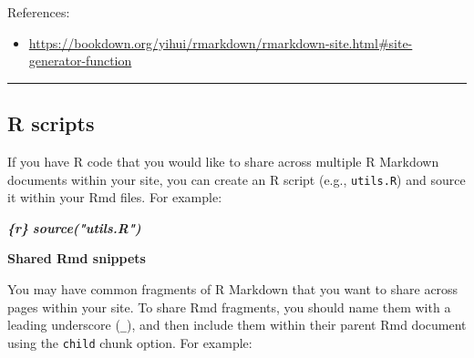 \documentclass[
  a4paper,
  twoside,
  openright]{book}
\newenvironment{Shaded}{\begin{snugshade}}{\end{snugshade}}
\newcommand{\InformationTok}[1]{\textcolor[rgb]{0.56,0.35,0.01}{\textbf{\textit{#1}}}}
\providecommand{\tightlist}{%
  \setlength{\itemsep}{0pt}\setlength{\parskip}{0pt}}
\theoremstyle{definition}
\theoremstyle{definition}
\theoremstyle{definition}
\theoremstyle{definition}
\theoremstyle{remark}
\begin{document}
References:

\begin{itemize}
\tightlist
\item
  \url{https://bookdown.org/yihui/rmarkdown/rmarkdown-site.html\#site-generator-function}
\end{itemize}

\begin{center}\rule{0.5\linewidth}{0.5pt}\end{center}

\subsection*{R scripts}\label{r-scripts}

If you have R code that you would like to share across multiple R Markdown documents within your site, you can create an R script (e.g., \texttt{utils.R}) and source it within your Rmd files. For example:

\begin{Shaded}
\begin{Highlighting}[]
\InformationTok{\textasciigrave{}\textasciigrave{}\textasciigrave{}\{r\}}
\InformationTok{source("utils.R")}
\InformationTok{\textasciigrave{}\textasciigrave{}\textasciigrave{}}
\end{Highlighting}
\end{Shaded}

\textbf{Shared Rmd snippets}

You may have common fragments of R Markdown that you want to share across pages within your site. To share Rmd fragments, you should name them with a leading underscore (\texttt{\_}), and then include them within their parent Rmd document using the \texttt{child} chunk option. For example:
\end{document}
